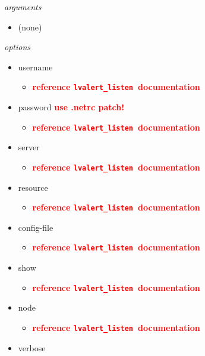 \documentclass{article}
\newcommand{\FIXME}[1]{\textcolor{red}{\textbf{#1}}}
\newcommand{\lvalertListen}{\texttt{lvalert\_listen}}
\begin{document}
\vspace{0.5cm}
\noindent
\textit{arguments}
\begin{itemize}
    \item{(none)}
\end{itemize}

\noindent
\textit{options}

\begin{itemize}
    \item{username
        \begin{itemize}
            \item{\FIXME{reference \lvalertListen~documentation}}
        \end{itemize}
         }
    \item{password \FIXME{use .netrc patch!}
        \begin{itemize}
            \item{\FIXME{reference \lvalertListen~documentation}}
        \end{itemize}
         }
    \item{server
        \begin{itemize}
            \item{\FIXME{reference \lvalertListen~documentation}}
        \end{itemize}
         }
    \item{resource
        \begin{itemize}
            \item{\FIXME{reference \lvalertListen~documentation}}
        \end{itemize}
         }
    \item{config-file
        \begin{itemize}
            \item{\FIXME{reference \lvalertListen~documentation}}
        \end{itemize}
         }
    \item{show
        \begin{itemize}
            \item{\FIXME{reference \lvalertListen~documentation}}
        \end{itemize}
         }
    \item{node
        \begin{itemize}
            \item{\FIXME{reference \lvalertListen~documentation}}
        \end{itemize}
         }
    \item{verbose
}
\end{itemize}
\end{document}
